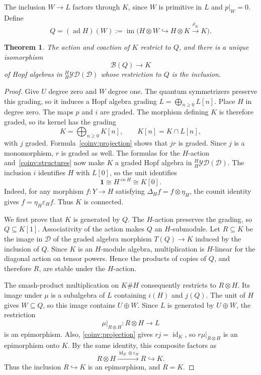 \documentclass[11pt, a4paper]{article}
\numberwithin{equation}{section}
\newcommand{\D}{\mathcal D}
\newcommand{\B}{\mathcal B}
\newcommand{\YD}{\mathcal{YD}}
\newcommand{\one}{\mathbf 1}
\DeclareMathOperator{\id}{id}
\DeclareMathOperator{\ad}{ad}
\DeclareMathOperator{\co}{co}
\DeclareMathOperator{\im}{im}
\newtheorem{theorem}{Theorem}[section]
\begin{document}
The inclusion $W\to L$ factors through $K$, since $W$ is primitive in
$L$ and $p|_W=0$. Define
\[
 Q=(\ad H)(W)
   :=\im\bigl(H\otimes W\hookrightarrow H\otimes K
                    \xrightarrow{\rho_K}K\bigr).
\]



\begin{theorem}\label{coinv:nichols}
The action and coaction of $K$ restrict to $Q$, and there is a unique
isomorphism
\[
 \B(Q)\longrightarrow K
\]
of Hopf algebras in ${}_H^H\YD(\D)$ whose restriction to $Q$ is the
inclusion.
\end{theorem}


\begin{proof}

Give $U$ degree zero and $W$ degree one.
The quantum symmetrizers preserve this grading, so it induces
a Hopf algebra grading
$
 L=\bigoplus_{n\geq0}L[n].
$
Place $H$ in degree zero. The maps $p$ and $i$ are graded.
The morphism defining $K$ is therefore graded, so its kernel has
the grading
\[
 K=\bigoplus_{n\geq0}K[n],
 \qquad K[n]=K\cap L[n],
\]
with $j$ graded. Formula~\eqref{coinv:projection} shows that
$jr$ is graded. Since $j$ is a monomorphism, $r$ is graded as well.
The formulas for the $H$-action and~\eqref{coinv:structures}
now make $K$ a graded Hopf algebra in ${}_H^H\YD(\D)$.
The inclusion $i$ identifies $H$ with $L[0]$, so the unit identifies
\[
 \one\cong H^{\co H}\cong K[0].
\]
Indeed, for any morphism $f:Y\to H$ satisfying
$\Delta_Hf=f\otimes\eta_H$, the counit identity
gives $f=\eta_H\varepsilon_Hf$.
Thus $K$ is connected.


We first prove that $K$ is generated by $Q$.
The $H$-action preserves the grading, so $Q\subseteq K[1]$.
Associativity of the action makes $Q$ an $H$-submodule.
Let $R\subseteq K$ be the image in $\D$ of the graded algebra
morphism $T(Q)\to K$ induced by the inclusion of $Q$.
Since $K$ is an $H$-module algebra, multiplication is
$H$-linear for the diagonal action on tensor powers.
Hence the products of copies of $Q$, and therefore $R$,
are stable under the $H$-action.


The smash-product multiplication on $K\#H$ consequently
restricts to $R\otimes H$.
Its image under $\mu$ is a subalgebra of $L$ containing
$i(H)$ and $j(Q)$.
The unit of $H$ gives $W\subseteq Q$, so this image contains
$U\oplus W$.
Since $L$ is generated by $U\oplus W$, the restriction
\[
 \mu|_{R\otimes H}:R\otimes H\longrightarrow L
\]
is an epimorphism.
Also, \eqref{coinv:projection} gives $rj=\id_K$, so
$r\mu|_{R\otimes H}$ is an epimorphism onto $K$.
By the same identity, this composite factors as
\[
 R\otimes H
 \xrightarrow{\id_R\otimes\varepsilon_H}
 R\hookrightarrow K.
\]
Thus the inclusion $R\hookrightarrow K$ is an epimorphism,
and $R=K$.


\end{proof}
\end{document}
